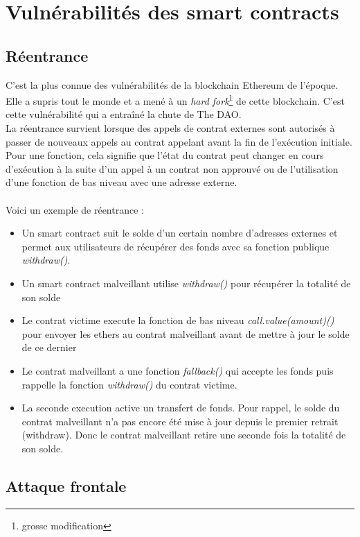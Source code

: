 \documentclass[12pt, a4paper, oneside]{book}
\begin{document}
    \section[Vulnérabilités des smart contracts]{Vulnérabilités des smart contracts~\cite{dasp}}
    \subsection{Réentrance}

    C'est la plus connue des vulnérabilités de la blockchain Ethereum de l'époque. Elle a supris tout le monde et a mené à un \emph{hard fork}\footnote{grosse modification} de cette blockchain. C'est cette vulnérabilité qui a entraîné la chute de The DAO.
    \\
    La réentrance survient lorsque des appels de contrat externes sont autorisés à passer de nouveaux appels au contrat appelant avant la fin de l'exécution initiale. Pour une fonction, cela signifie que l'état du contrat peut changer en cours d'exécution à la suite d'un appel à un contrat non approuvé ou de l'utilisation d'une fonction de bas niveau avec une adresse externe.
    \\
    \\
    Voici un exemple de réentrance :
    \begin{itemize}
        \item Un smart contract suit le solde d'un certain nombre d'adresses externes et permet aux utilisateurs de récupérer des fonds avec sa fonction publique \emph{withdraw()}.
        \item Un smart contract malveillant utilise \emph{withdraw()} pour récupérer la totalité de son solde
        \item Le contrat victime execute la fonction de bas niveau \emph{call.value(amount)()} pour envoyer les ethers au contrat malveillant avant de mettre à jour le solde de ce dernier
        \item Le contrat malveillant a une fonction \emph{fallback()} qui accepte les fonds puis rappelle la fonction \emph{withdraw()} du contrat victime.
        \item La seconde execution active un transfert de fonds. Pour rappel, le solde du contrat malveillant n'a pas encore été mise à jour depuis le premier retrait (withdraw). Donc le contrat malveillant retire une seconde fois la totalité de son solde.
    \end{itemize}

    \subsection{Attaque frontale}
\end{document}
